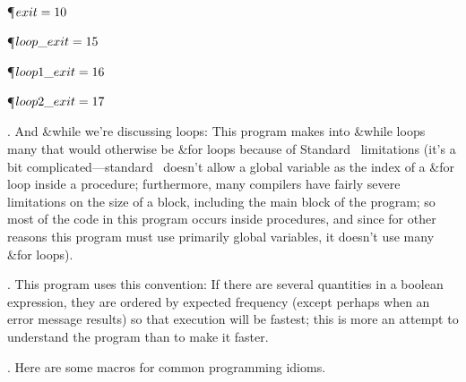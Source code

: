 \Y\P\D {}$\\{exit}=10$\par
\P\D {}$\\{loop\_exit}=15$\par
\P\D {}$\\{loop1\_exit}=16$\par
\P\D {}$\\{loop2\_exit}=17$\par
\fi

.
And  \&{while}  we're discussing loops: This program makes into  \&{while}
loops many that would otherwise be  \&{for}  loops because of Standard
\PASCAL\ limitations (it's a bit complicated---standard \PASCAL\
doesn't allow a global variable as the index of a  \&{for}  loop inside a
procedure; furthermore, many compilers have fairly severe limitations
on the size of a block, including the main block of the program; so
most of the code in this program occurs inside procedures, and since
for other reasons this program must use primarily global variables, it
doesn't use many  \&{for}  loops).


\fi

.
This program uses this convention: If there are several quantities in
a boolean expression, they are ordered by expected frequency (except
perhaps when an error message results) so that execution will be
fastest; this is more an attempt to understand the program than to
make it faster.


\fi

.
Here are some macros for common programming idioms.

